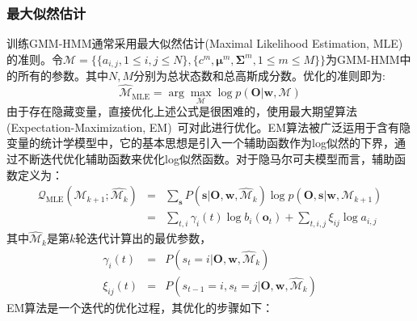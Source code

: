 \subsubsection{最大似然估计}
训练GMM-HMM通常采用最大似然估计(Maximal Likelihood Estimation, MLE)的准则。令$\mathcal{M}= \lbrace \{ a_{i,j}, 1 \le i,j \le N \}, \{ c^m, \bm{\mu}^m, \bm{\Sigma}^m, 1 \le m \le M \} \rbrace$为GMM-HMM中的所有的参数。其中$N,M$分别为总状态数和总高斯成分数。优化的准则即为:
\begin{equation}
    \hat{\mathcal{M}}_{\text{MLE}} = \arg \max_{\mathcal{M}}\log p(\mathbf{O}|\mathbf{w}, \mathcal{M}) 
\end{equation}
由于存在隐藏变量，直接优化上述公式是很困难的，使用最大期望算法(Expectation-Maximization, EM)~\cite{dempster1977maximum}可对此进行优化。EM算法被广泛运用于含有隐变量的统计学模型中，它的基本思想是引入一个辅助函数作为log似然的下界，通过不断迭代优化辅助函数来优化log似然函数。对于隐马尔可夫模型而言，辅助函数定义为：
\begin{eqnarray}
\mathcal{Q}_{\text{MLE}}(\mathcal{M}_{k+1};\hat{\mathcal{M}_{k}}) &=& \sum_{\mathbf{s}} P(\mathbf{s}|\mathbf{O},\mathbf{w}, \hat{\mathcal{M}}_k) \log p(\mathbf{O}, \mathbf{s}|\mathbf{w}, \mathcal{M}_{k+1}) \\
&=& \sum_{t,i} \gamma_i(t)\log b_i(\mathbf{o}_t) + \sum_{t,i,j}\xi_{ij}\log a_{i,j}
\end{eqnarray}
其中$\hat{\mathcal{M}}_k$是第$k$轮迭代计算出的最优参数，
\begin{eqnarray}
\gamma_i(t)&=&P(s_t=i|\mathbf{O},\mathbf{w},\hat{\mathcal{M}}_k) \\
\xi_{ij}(t)&=&P(s_{t-1}=i,s_t=j|\mathbf{O},\mathbf{w},\hat{\mathcal{M}}_k)
\end{eqnarray}
EM算法是一个迭代的优化过程，其优化的步骤如下：
